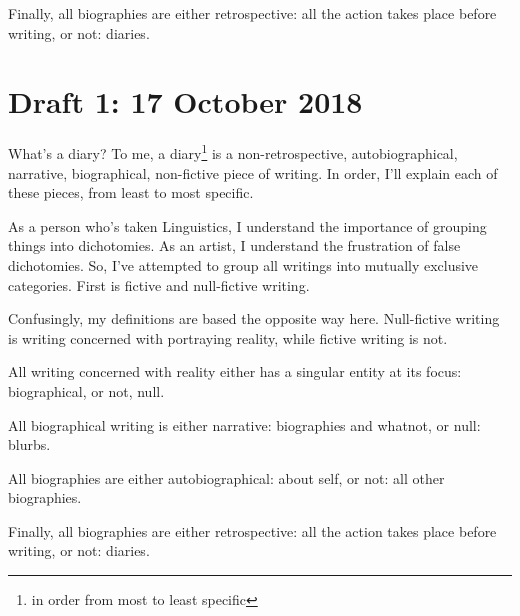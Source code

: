 \documentclass[12pt]{article}[titlepage]
\newcommand{\1}{\={a}}
\newcommand{\2}{\={e}}
\newcommand{\3}{\={\i}}
\newcommand{\4}{\=o}
\newcommand{\5}{\=u}
\newcommand{\6}{\={A}}
\renewcommand{\,}{\textsuperscript{,}}
\begin{document}
Finally, all biographies are either retrospective: all the action takes place before writing, or not: diaries.

\section{Draft 1: 17 October 2018}
What's a diary?
To me, a diary\footnote{in order from most to least specific} is a non-retrospective, autobiographical, narrative, biographical, non-fictive piece of writing.
In order, I'll explain each of these pieces, from least to most specific.

As a person who's taken Linguistics, I understand the importance of grouping things into dichotomies.
As an artist, I understand the frustration of false dichotomies.
So, I've attempted to group all writings into mutually exclusive categories.
First is fictive and null-fictive writing.

Confusingly, my definitions are based the opposite way here.
Null-fictive writing is writing concerned with portraying reality, while fictive writing is not.

All writing concerned with reality either has a singular entity at its focus: biographical, or not, null.

All biographical writing is either narrative: biographies and whatnot, or null: blurbs.

All biographies are either autobiographical: about self, or not: all other biographies.

Finally, all biographies are either retrospective: all the action takes place before writing, or not: diaries.
\end{document}
